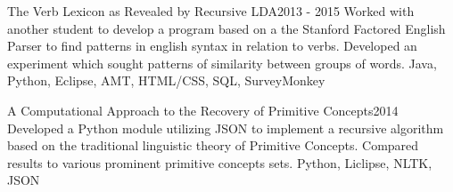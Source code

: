 %
%
%


\begin{projects}
	\project
	{The Verb Lexicon as Revealed by Recursive LDA}{2013 - 2015}
	{ }
	{Worked with another student to develop a program based on a the Stanford Factored English Parser to find patterns in english syntax in relation to verbs. Developed an experiment which sought patterns of similarity between groups of words.}
	{Java, Python, Eclipse, AMT, HTML/CSS, SQL, SurveyMonkey}
				
	\project
	{A Computational Approach to the Recovery of Primitive Concepts}{2014}
	{ }
	{Developed a Python module utilizing JSON to implement a recursive algorithm based on the traditional linguistic theory of Primitive Concepts. Compared results to various prominent primitive concepts sets.}
	{Python, Liclipse, NLTK, JSON}

\end{projects}
